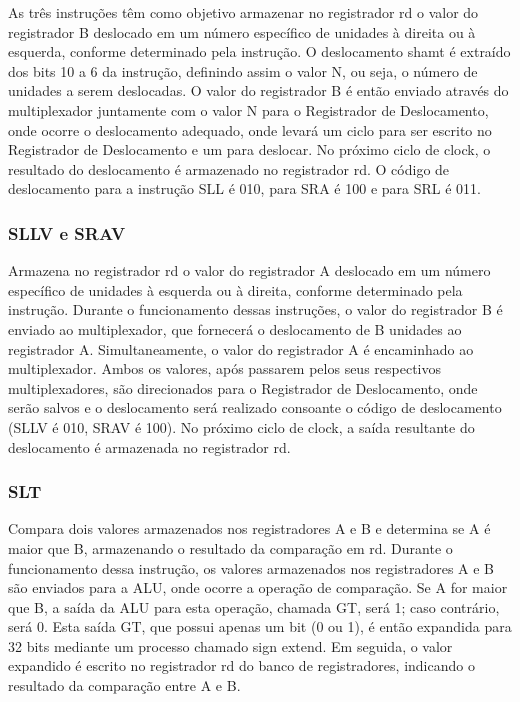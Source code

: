 As três instruções têm como objetivo armazenar no registrador rd o valor do registrador B deslocado em um número específico de unidades à direita ou à esquerda, conforme determinado pela instrução. O deslocamento shamt é extraído dos bits 10 a 6 da instrução, definindo assim o valor N, ou seja, o número de unidades a serem deslocadas. O valor do registrador B é então enviado através do multiplexador juntamente com o valor N para o Registrador de Deslocamento, onde ocorre o deslocamento adequado, onde levará um ciclo para ser escrito no Registrador de Deslocamento e um para deslocar. No próximo ciclo de clock, o resultado do deslocamento é armazenado no registrador rd. O código de deslocamento para a instrução SLL é 010, para SRA é 100 e para SRL é 011.

\subsubsection{SLLV e SRAV}

Armazena no registrador rd o valor do registrador A deslocado em um número específico de unidades à esquerda ou à direita, conforme determinado pela instrução. Durante o funcionamento dessas instruções, o valor do registrador B é enviado ao multiplexador, que fornecerá o deslocamento de B unidades ao registrador A. Simultaneamente, o valor do registrador A é encaminhado ao multiplexador. Ambos os valores, após passarem pelos seus respectivos multiplexadores, são direcionados para o Registrador de Deslocamento, onde serão salvos e o deslocamento será realizado consoante o código de deslocamento (SLLV é 010, SRAV é 100). No próximo ciclo de clock, a saída resultante do deslocamento é armazenada no registrador rd.

\subsubsection{SLT}

Compara dois valores armazenados nos registradores A e B e determina se A é maior que B, armazenando o resultado da comparação em rd. Durante o funcionamento dessa instrução, os valores armazenados nos registradores A e B são enviados para a ALU, onde ocorre a operação de comparação. Se A for maior que B, a saída da ALU para esta operação, chamada GT, será 1; caso contrário, será 0. Esta saída GT, que possui apenas um bit (0 ou 1), é então expandida para 32 bits mediante um processo chamado sign extend. Em seguida, o valor expandido é escrito no registrador rd do banco de registradores, indicando o resultado da comparação entre A e B.

